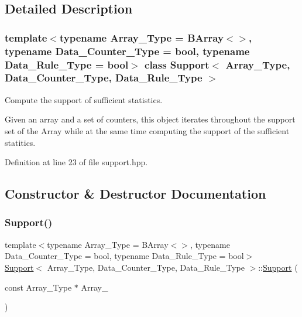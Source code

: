 \subsection{Detailed Description}
\subsubsection*{template$<$typename Array\+\_\+\+Type = B\+Array$<$$>$, typename Data\+\_\+\+Counter\+\_\+\+Type = bool, typename Data\+\_\+\+Rule\+\_\+\+Type = bool$>$\newline
class Support$<$ Array\+\_\+\+Type, Data\+\_\+\+Counter\+\_\+\+Type, Data\+\_\+\+Rule\+\_\+\+Type $>$}

Compute the support of sufficient statistics. 

Given an array and a set of counters, this object iterates throughout the support set of the Array while at the same time computing the support of the sufficient statitics. 

Definition at line 23 of file support.\+hpp.



\subsection{Constructor \& Destructor Documentation}
\mbox{\label{class_support_aacc2852ede9e8d1294b8f2ea5625d525}} 
\subsubsection{\texorpdfstring{Support()}{Support()}\hspace{0.1cm}{\footnotesize\ttfamily [1/3]}}
{\footnotesize\ttfamily template$<$typename Array\+\_\+\+Type = B\+Array$<$$>$, typename Data\+\_\+\+Counter\+\_\+\+Type = bool, typename Data\+\_\+\+Rule\+\_\+\+Type = bool$>$ \\
\hyperlink{class_support}{Support}$<$ Array\+\_\+\+Type, Data\+\_\+\+Counter\+\_\+\+Type, Data\+\_\+\+Rule\+\_\+\+Type $>$\+::\hyperlink{class_support}{Support} (\begin{DoxyParamCaption}\item[{const Array\+\_\+\+Type $\ast$}]{Array\+\_\+ }\end{DoxyParamCaption})\hspace{0.3cm}{\ttfamily [inline]}}




